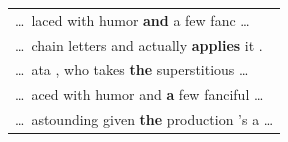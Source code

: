 \begin{longtable}{@{}>{\ttfamily}p{\linewidth}@{}}
    \dots\ laced with humor\textbf{ and} a few fanc \dots\\
    \dots\ chain letters and actually\textbf{ applies} it .\\
    \dots\ ata , who takes\textbf{ the} superstitious \dots\\
    \dots\ aced with humor and\textbf{ a} few fanciful \dots\\
    \dots\ astounding given\textbf{ the} production 's a \dots\\

\end{longtable}
